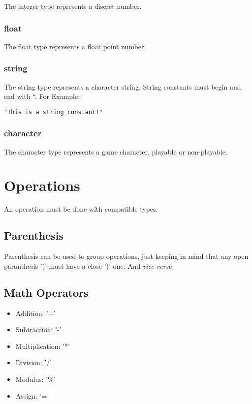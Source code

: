 \documentclass[ letterpaper,12pt]{article}
\begin{document}
The integer type represents a discret number.

\subsubsection{float}

The float type represents a float point number.

\subsubsection{string}

The string type represents a character string. String constants must begin and
end with ``. For Example:

\begin{verbatim}
"This is a string constant!"
\end{verbatim}

\subsubsection{character}

The character type represents a game character, playable or non-playable.

\section{Operations}

An operation must be done with compatible types.

\subsection{Parenthesis}

Parenthesis can be used to group operations, just keeping in mind that any open
paranthesis '(' must have a close ')' one. And {\it vice-versa}.

\subsection{Math Operators}

\begin{itemize}
\item{Addition: '+'}
\item{Subtraction: '-'}
\item{Multiplication: '*'}
\item{Division: '/'}
\item{Modulus: '\%'}
\item{Assign: '='}
\end{itemize}
\end{document}
